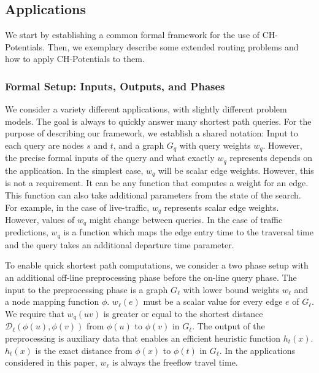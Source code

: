 \documentclass[a4paper,UKenglish,cleveref, autoref, thm-restate]{lipics-v2021}
\newcommand*{\dist}{\mathcal{D}}
\begin{document}
\subsection{Applications}\label{sec:extensions}

We start by establishing a common formal framework for the use of CH-Potentials.
Then, we exemplary describe some extended routing problems and how to apply CH-Potentials to them.

\subsubsection{Formal Setup: Inputs, Outputs, and Phases}

We consider a variety different applications, with slightly different problem models.
The goal is always to quickly answer many shortest path queries.
For the purpose of describing our framework, we establish a shared notation:
Input to each query are nodes $s$ and $t$, and a graph $G_q$ with query weights $w_q$.
However, the precise formal inputs of the query and what exactly $w_q$ represents depends on the application.
In the simplest case, $w_q$ will be scalar edge weights.
However, this is not a requirement.
It can be any function that computes a weight for an edge.
This function can also take additional parameters from the state of the search.
For example, in the case of live-traffic, $w_q$ represents scalar edge weights.
However, values of $w_q$ might change between queries.
In the case of traffic predictions, $w_q$ is a function which maps the edge entry time to the traversal time and the query takes an additional departure time parameter.

To enable quick shortest path computations, we consider a two phase setup with an additional off-line preprocessing phase before the on-line query phase.
The input to the preprocessing phase is a graph $G_\ell$ with lower bound weights $w_\ell$ and a node mapping function $\phi$.
$w_\ell(e)$ must be a scalar value for every edge $e$ of $G_\ell$.
We require that $w_q(u v)$ is greater or equal to the shortest distance $\dist_\ell(\phi(u), \phi(v))$ from $\phi(u)$ to $\phi(v)$ in $G_\ell$. %
The output of the preprocessing is auxiliary data that enables an efficient heuristic function $h_t(x)$.
$h_t(x)$ is the exact distance from $\phi(x)$ to $\phi(t)$ in $G_\ell$.
In the applications considered in this paper, $w_\ell$ is always the freeflow travel time.
\end{document}
